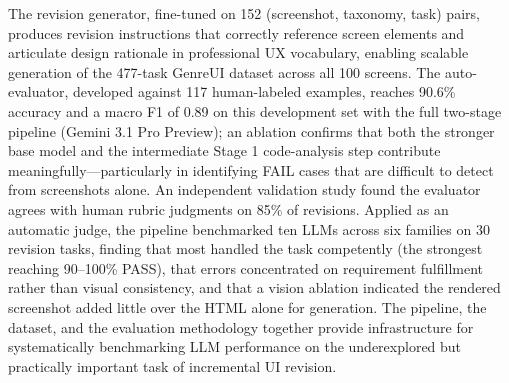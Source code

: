 \documentclass[sigconf,nonacm]{acmart}
\begin{document}
The revision generator, fine-tuned on 152 (screenshot, taxonomy, task) pairs, produces revision instructions that correctly reference screen elements and articulate design rationale in professional UX vocabulary, enabling scalable generation of the 477-task GenreUI dataset across all 100 screens. The auto-evaluator, developed against 117 human-labeled examples, reaches 90.6\% accuracy and a macro F1 of 0.89 on this development set with the full two-stage pipeline (Gemini 3.1 Pro Preview); an ablation confirms that both the stronger base model and the intermediate Stage 1 code-analysis step contribute meaningfully—particularly in identifying FAIL cases that are difficult to detect from screenshots alone. An independent validation study found the evaluator agrees with human rubric judgments on 85\% of revisions. Applied as an automatic judge, the pipeline benchmarked ten LLMs across six families on 30 revision tasks, finding that most handled the task competently (the strongest reaching 90--100\% PASS), that errors concentrated on requirement fulfillment rather than visual consistency, and that a vision ablation indicated the rendered screenshot added little over the HTML alone for generation. The pipeline, the dataset, and the evaluation methodology together provide infrastructure for systematically benchmarking LLM performance on the underexplored but practically important task of incremental UI revision.
\end{document}
